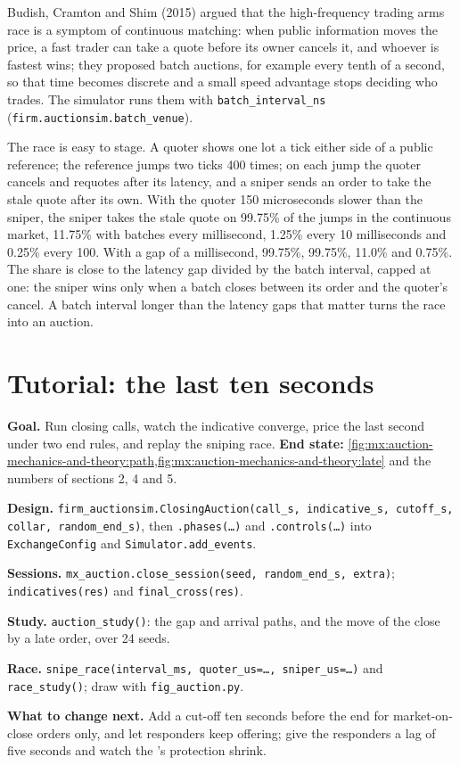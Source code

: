 Budish, Cramton and Shim (2015) argued that the high-frequency trading arms race is a symptom of continuous matching: when public information moves the
price, a fast trader can take a quote before its owner cancels it, and whoever is fastest wins; they proposed batch auctions, for example every tenth of a
second, so that time becomes discrete and a small speed advantage stops deciding who trades. The simulator runs them with
\texttt{batch\_interval\_ns} (\texttt{firm.auctionsim.batch\_venue}).

The race is easy to stage. A quoter shows one lot a tick either side of a public reference; the reference jumps two ticks 400 times; on each jump the
quoter cancels and requotes after its latency, and a sniper sends an order to take the stale quote after its own. With the quoter 150 microseconds slower
than the sniper, the sniper takes the stale quote on 99.75\% of the jumps in the continuous market, 11.75\% with batches every millisecond, 1.25\% every
10 milliseconds and 0.25\% every 100. With a gap of a millisecond, 99.75\%, 99.75\%, 11.0\% and 0.75\%. The share is close to the latency gap divided by the
batch interval, capped at one: the sniper wins only when a batch closes between its order and the quoter's cancel. A batch interval longer than the
latency gaps that matter turns the race into an auction.

\section{Tutorial: the last ten seconds}\label{tut:mx:auction-mechanics-and-theory:tut}

\begin{tutorial}
\textbf{Goal.} Run closing calls, watch the indicative converge, price the last second under two end rules, and replay the sniping race.
\textbf{End state:} \cref{fig:mx:auction-mechanics-and-theory:path,fig:mx:auction-mechanics-and-theory:late} and the numbers of sections 2, 4 and 5.
\begin{tutsteps}
\item \textbf{Design.} \texttt{firm\_auctionsim.ClosingAuction(call\_s, indicative\_s, cutoff\_s, collar, random\_end\_s)}, then
\texttt{.phases(\dots)} and \texttt{.controls(\dots)} into \texttt{ExchangeConfig} and \texttt{Simulator.add\_events}.
\item \textbf{Sessions.} \texttt{mx\_auction.close\_session(seed, random\_end\_s, extra)}; \texttt{indicatives(res)} and \texttt{final\_cross(res)}.
\item \textbf{Study.} \texttt{auction\_study()}: the gap and arrival paths, and the move of the close by a late order, over 24 seeds.
\item \textbf{Race.} \texttt{snipe\_race(interval\_ms, quoter\_us=\dots, sniper\_us=\dots)} and \texttt{race\_study()}; draw with \texttt{fig\_auction.py}.
\end{tutsteps}
\textbf{What to change next.} Add a cut-off ten seconds before the end for market-on-close orders only, and let responders keep offering; give the
responders a lag of five seconds and watch the 's protection shrink.
\end{tutorial}

